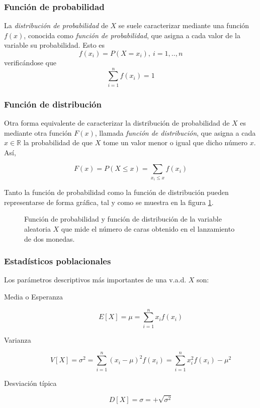 \subsubsection{Función de probabilidad}
La \emph{distribución de probabilidad} de $X$ se suele caracterizar mediante una función $f(x)$, conocida como
\emph{función de probabilidad}, que asigna a cada valor de la variable su probabilidad. 
Esto es 
\[
f(x_i)=P(X=x_i),\
i=1,..,n
\]
verificándose que 
\[
\sum_{i=1}^{n} f(x_i)=1
\]


\subsubsection{Función de distribución}
Otra forma equivalente de caracterizar la distribución de probabilidad de $X$ es mediante otra función $F(x)$, llamada
\emph{función de distribución}, que asigna a cada $x\in \mathbb{R}$ la probabilidad de que $X$ tome un valor menor o
igual que dicho número $x$. Así,

\[
F(x) = P(X \le x) = \sum\limits_{x_i  \le x} {f(x_i)}
\]

Tanto la función de probabilidad como la función de distribución pueden representarse de forma gráfica, tal y como se
muestra en la figura \ref{g:graficasvad}.

\begin{figure}[h!]
\centering {}\qquad
{}
\caption{Función de probabilidad y función de distribución de la variable aleatoria $X$ que mide el número de caras obtenido en el lanzamiento de dos monedas.} \label{g:graficasvad}
\end{figure}


\subsubsection{Estadísticos poblacionales}
Los parámetros descriptivos más importantes de una v.a.d. $X$ son:
\begin{description}
\item [Media o Esperanza]
\[
E[X]=\mu  = \sum\limits_{i = 1}^n {x_i f(x_i )}
\]

\item [Varianza]
\[
V[X]=\sigma ^2  = \sum\limits_{i = 1}^n {(x_i  - \mu )^2 f(x_i ) = }
\sum\limits_{i = 1}^n {x_i ^2 f(x_i ) - \mu ^2 }
\]

\item [Desviación típica]
\[
D[X]=\sigma  =  + \sqrt {\sigma ^2 }
\]
\end{description}

